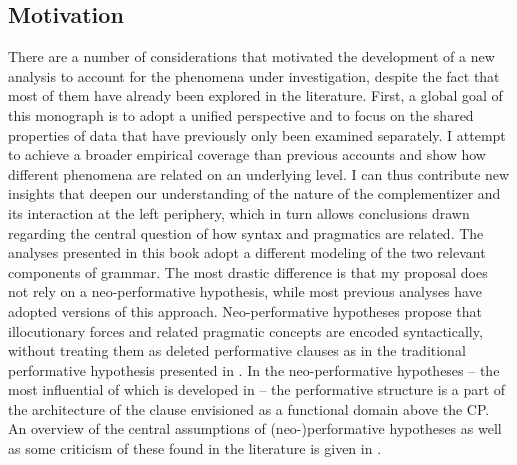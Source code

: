 \subsection{Motivation}\largerpage
There are a number of considerations that motivated the development of a new analysis to account for the phenomena under investigation, despite the fact that most of them  have already been explored in the literature. First, a global goal of this monograph is  to adopt a unified perspective and to focus on the shared properties of data that have previously only been examined separately.  I attempt to achieve a  broader empirical coverage than previous accounts and  show how different phenomena are related on an underlying level.   I can thus contribute new insights that deepen our understanding of the nature of the complementizer and its interaction at the left periphery,  which in turn allows conclusions drawn regarding the central question of how syntax and pragmatics are related.    The analyses presented  in this book adopt a different modeling of the two relevant components  of grammar. The most drastic difference is that my proposal does not rely on a neo-performative hypothesis, while most previous analyses have adopted versions of this approach.  Neo-performative hypotheses propose that illocutionary forces and related pragmatic concepts are encoded syntactically, without treating them as deleted performative clauses as in the traditional performative hypothesis presented in \citet{Ross1970}. In the neo-performative hypotheses -- the most influential of which is developed in \citet{SpeasTenny2003} -- the performative structure is a part of the 
 architecture of the clause envisioned as a functional domain above the CP.  An overview of the central assumptions of (neo-)performative hypotheses as well as some criticism of these found in the literature is given in . 


